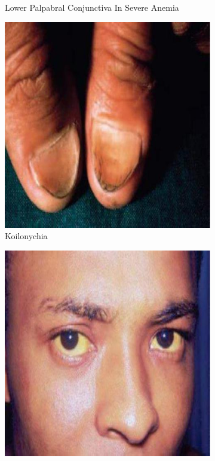 \documentclass[a4paper,12pt,openany,twoside]{book}
\begin{document}
{\begin{figure}[h]
\begin{subfigure}[t]{.23\textwidth}
																	\caption{Lower Palpabral Conjunctiva In Severe Anemia}
																	\label{pallor}
																\end{subfigure}
																\hspace{\fill}
																\begin{subfigure}[t]{.23\textwidth}
																	\centering
																	\includegraphics[width=\textwidth]{./clinicalPhysioPic/koilonychia.jpg}
																	\caption{Koilonychia}
																	\label{koilonychia}
																\end{subfigure}
																\hspace{\fill}
																\begin{subfigure}[t]{.23\textwidth}
																	\centering
																	\includegraphics[width=\textwidth]{./clinicalPhysioPic/jaundice.jpg}

\end{subfigure}
\end{figure}}
\end{document}
